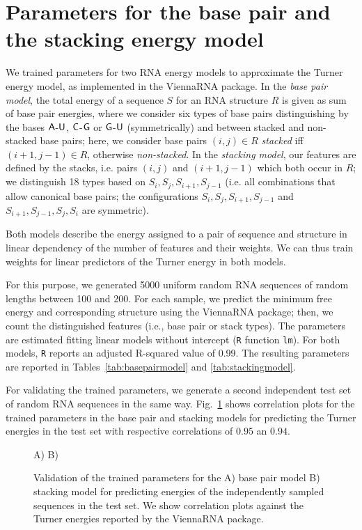 \documentclass[10pt]{article}
\makeatletter
\newlength{\@aligneps}
\newcommand{\includegraphicstop}[2][]{%
\sbox{\@alignepsbox}{\texttt{[image: \#2]}}%
\setlength{\@aligneps}{-\ht\@alignepsbox}%
\addtolength{\@aligneps}{2ex}%
\raisebox{\@aligneps}{\usebox{\@alignepsbox}}}
\newcommand{\Def}[1]{\emph{#1}}
\newcommand{\Nuc}[1]{{\sf #1}}
\newcommand{\Ab}{\Nuc{A}}
\newcommand{\Cb}{\Nuc{C}}
\newcommand{\Gb}{\Nuc{G}}
\newcommand{\Ub}{\Nuc{U}}
\newcommand{\Software}[1]{{\ttfamily #1}}
\makeatother
\begin{document}
\section{Parameters for the base pair and the stacking energy model}
\label{appsec:modelparameters}

We trained parameters for two RNA energy models to approximate the
Turner energy model, as implemented in the \Software{ViennaRNA}
package.  In the \Def{base pair model}, the total energy of a sequence $S$
for an RNA structure $R$ is given as sum of base pair energies, where
we consider six types of base pairs distinguishing by the bases $\Ab$-$\Ub$,
$\Cb$-$\Gb$ or $\Gb$-$\Ub$ (symmetrically) and between stacked and non-stacked base
pairs; here, we consider base pairs $(i,j)\in R$ \Def{stacked} iff
$(i+1,j-1)\in R$, otherwise \Def{non-stacked}. In the \Def{stacking model},
our features are defined by the stacks, i.e. pairs $(i,j)$ and
$(i+1,j-1)$ which both occur in $R$; we distinguish 18 types based on
$S_i,S_j,S_{i+1},S_{j-1}$ (i.e. all combinations that allow canonical
base pairs; the configurations $S_i,S_j,S_{i+1},S_{j-1}$ and
$S_{i+1},S_{j-1},S_j,S_i$ are symmetric).

Both models describe the energy assigned to a pair of sequence and
structure in linear dependency of the number of features and their
weights. We can thus train weights for linear predictors of the Turner
energy in both models.

For this purpose, we generated 5000 uniform random RNA sequences of
random lengths between 100 and 200. For each sample, we predict the
minimum free energy and corresponding structure using the ViennaRNA
package; then, we count the distinguished features (i.e., base pair or
stack types). The parameters are estimated fitting linear models
without intercept (\texttt{R} function \texttt{lm}). For both models,
\texttt{R} reports an adjusted R-squared value of 0.99. The resulting
parameters are reported in Tables~\ref{tab:basepairmodel} and
\ref{tab:stackingmodel}.

For validating the trained parameters, we generate a second
independent test set of random RNA sequences in the same
way. Fig.~\ref{appfig:training-cor} shows correlation plots for the
trained parameters in the base pair and stacking models for predicting
the Turner energies in the test set with respective correlations of
$0.95$ an $0.94$.

\begin{figure}[h!]
  \centering
  A)\includegraphicstop[width=0.4\textwidth,trim=0 0 0 50,clip]{Figs/basepaircor}
  B)\includegraphicstop[width=0.4\textwidth,trim=0 0 0 50,clip]{Figs/stackingcor}
  \caption{Validation of the trained parameters for the A) base pair
    model B) stacking model for predicting energies of the
    independently sampled sequences in the test set. We show
    correlation plots against the Turner energies reported by the
    ViennaRNA package.}
  \label{appfig:training-cor}
\end{figure}
\end{document}
